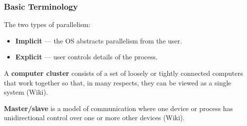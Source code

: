 \documentclass[aspectratio=169]{beamer}\usepackage[]{graphicx}\usepackage[]{color}
\begin{document}
\begin{frame}
  \frametitle{Basic Terminology}
  The two types of parallelism:
  \begin{itemize}
    \item \textbf{Implicit} --- the OS abstracts parallelism from the user.
    \item \textbf{Explicit} --- user controls details of the process.
  \end{itemize}
  
  \vspace{2mm}
  A \textbf{computer cluster} consists of a set of loosely or tightly connected computers that work together so that, in many respects, 
  they can be viewed as a single system (Wiki).
  
  \vspace{2mm}
  \textbf{Master/slave} is a model of communication where one device or process has unidirectional control over one or more other devices (Wiki).
  
\end{frame}
\end{document}
